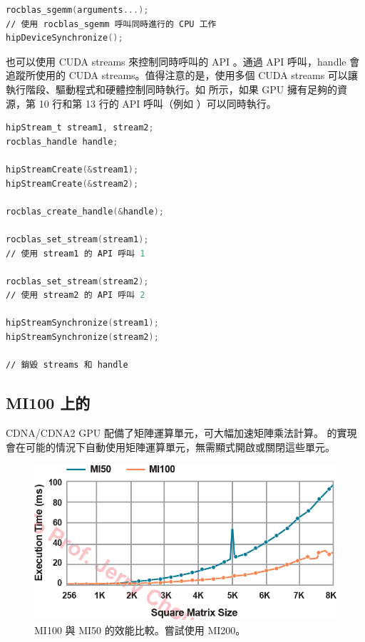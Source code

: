 \begin{lstlisting}[language=C, caption={\term{rocBLAS} 與 CPU 同時執行。}, captionpos=t, label={lst:overlap}]
rocblas_sgemm(arguments...);
∕∕ 使用 rocblas_sgemm 呼叫同時進行的 CPU 工作
hipDeviceSynchronize();
\end{lstlisting}

也可以使用 CUDA streams 來控制同時呼叫的 API 。通過  API 呼叫，handle 會追蹤所使用的 CUDA streams。值得注意的是，使用多個 CUDA streams 可以讓執行階段、驅動程式和硬體控制同時執行。如  所示，如果 GPU 擁有足夠的資源，第 10 行和第 13 行的 API 呼叫（例如 ）可以同時執行。

\begin{lstlisting}[language=C, caption={多裝置與多 CUDA streams 的 \term{rocBLAS} 執行}, captionpos=t, label={lst:stream}]
hipStream_t stream1, stream2;
rocblas_handle handle;

hipStreamCreate(&stream1);
hipStreamCreate(&stream2);

rocblas_create_handle(&handle);

rocblas_set_stream(stream1);
∕∕ 使用 stream1 的 API 呼叫 1

rocblas_set_stream(stream2);
∕∕ 使用 stream2 的 API 呼叫 2

hipStreamSynchronize(stream1);
hipStreamSynchronize(stream2);

∕∕ 銷毀 streams 和 handle
\end{lstlisting}

\subsection{MI100 上的 }
CDNA/CDNA2 GPU 配備了矩陣運算單元，可大幅加速矩陣乘法計算。 的實現會在可能的情況下自動使用矩陣運算單元，無需顯式開啟或關閉這些單元。

\begin{figure}
    \centering
    \includegraphics[width=0.9\linewidth]{FileAusiliari/Screenshots/Figure9-1.png}
    \caption{MI100 與 MI50 的效能比較。嘗試使用 MI200。}
    \label{fig:MI100}
\end{figure}

